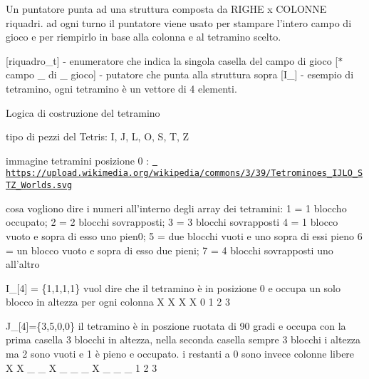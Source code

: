 Un puntatore punta ad una struttura composta da RIGHE x COLONNE riquadri. ad ogni turno il puntatore viene usato per stampare l’intero campo di gioco e per riempirlo in base alla colonna e al tetramino scelto.

\mbox{[}riquadro\+\_\+t\mbox{]} -\/ enumeratore che indica la singola casella del campo di gioco \mbox{[}$\ast$ campo \+\_\+ di \+\_\+ gioco\mbox{]} -\/ putatore che punta alla struttura sopra \mbox{[}I\+\_\mbox{]} -\/ esempio di tetramino, ogni tetramino è un vettore di 4 elementi.

Logica di costruzione del tetramino

tipo di pezzi del Tetris\+: I, J, L, O, S, T, Z

immagine tetramini posizione 0 \+: \href{https://upload.wikimedia.org/wikipedia/commons/3/39/Tetrominoes_IJLO_STZ_Worlds.svg}{\texttt{ https\+://upload.\+wikimedia.\+org/wikipedia/commons/3/39/\+Tetrominoes\+\_\+\+IJLO\+\_\+\+STZ\+\_\+\+Worlds.\+svg}}

cosa vogliono dire i numeri all’interno degli array dei tetramini\+: 1 = 1 bloccho occupato; 2 = 2 blocchi sovrapposti; 3 = 3 blocchi sovrapposti 4 = 1 blocco vuoto e sopra di esso uno pien0; 5 = due blocchi vuoti e uno sopra di essi pieno 6 = un blocco vuoto e sopra di esso due pieni; 7 = 4 blocchi sovrapposti uno all’altro

I\+\_\+\mbox{[}4\mbox{]} = \{1,1,1,1\} vuol dire che il tetramino è in posizione 0 e occupa un solo blocco in altezza per ogni colonna X X X X 0 1 2 3

J\+\_\mbox{[}4\mbox{]}=\{3,5,0,0\} il tetramino è in poszione ruotata di 90 gradi e occupa con la prima casella 3 blocchi in altezza, nella seconda casella sempre 3 blocchi i altezza ma 2 sono vuoti e 1 è pieno e occupato. i restanti a 0 sono invece colonne libere X X \+\_\+ \+\_\+ X \+\_\+ \+\_\+ \+\_\+ X \+\_\+ \+\_\+ \+\_ 1 2 3 